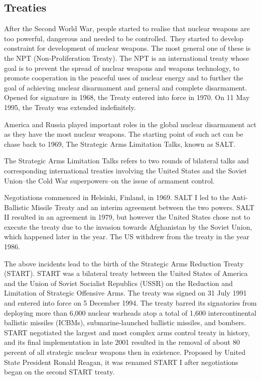 \documentclass[twoside,titlepage,11pt,twocolumn,a4paper]{article}
\begin{document}
\subsection{Treaties}
After the Second World War, people started to realise that nuclear
weapons are too powerful, dangerous and needed to be controlled. They
started to develop constraint for development of nuclear weapons.  The
most general one of these is the NPT (Non-Proliferation
Treaty). \citep{unoda} The NPT is an international treaty whose goal
is to prevent the spread of nuclear weapons and weapons technology, to
promote cooperation in the peaceful uses of nuclear energy and to
further the goal of achieving nuclear disarmament and general and
complete disarmament.  Opened for signature in 1968, the Treaty
entered into force in 1970.  On 11 May 1995, the Treaty was extended
indefinitely.

America and Russia played important roles in the global nuclear
disarmament act as they have the most nuclear weapons. The starting
point of such act can be chase back to 1969, The Strategic Arms
Limitation Talks, known as SALT.

The Strategic Arms Limitation Talks refers to two rounds of bilateral
talks and corresponding international treaties involving the United
States and the Soviet Union--the Cold War superpowers--on the issue of
armament control.

Negotiations commenced in Helsinki, Finland, in 1969. SALT I led to
the Anti-Ballistic Missile Treaty and an interim agreement between the
two powers. \citep{burr2001} SALT II resulted in an agreement in 1979,
but however the United States chose not to execute the treaty due to
the invasion towards Afghanistan by the Soviet Union, which happened
later in the year. The US withdrew from the treaty in the year 1986.

The above incidents lead to the birth of the Strategic Arms
Reduction Treaty (START). \citep{startI} START was a bilateral treaty between
the United States of America and the Union of Soviet Socialist
Republics (USSR) on the Reduction and Limitation of Strategic
Offensive Arms. The treaty was signed on 31 July 1991 and entered into
force on 5 December 1994.  The treaty barred its signatories from
deploying more than 6,000 nuclear warheads atop a total of 1,600
intercontinental ballistic missiles (ICBMs), submarine-launched 
ballistic missiles, and bombers. START
negotiated the largest and most complex arms control treaty in
history, and its final implementation in late 2001 resulted in the
removal of about 80 percent of all strategic nuclear weapons then in
existence. Proposed by United State President Ronald Reagan, it was
renamed START I after negotiations began on the second START treaty.
\end{document}
